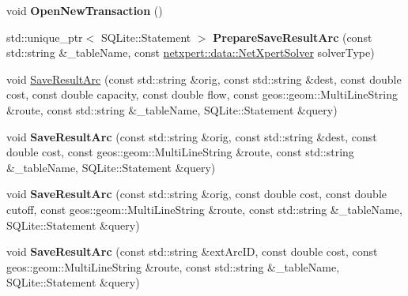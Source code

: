 \begin{DoxyCompactItemize}
\item 
void {\bfseries Open\+New\+Transaction} ()\hypertarget{classnetxpert_1_1io_1_1SpatiaLiteWriter_aa469d8a214f7a3e2fbbde78480f1ceae}{}\label{classnetxpert_1_1io_1_1SpatiaLiteWriter_aa469d8a214f7a3e2fbbde78480f1ceae}

\item 
std\+::unique\+\_\+ptr$<$ S\+Q\+Lite\+::\+Statement $>$ {\bfseries Prepare\+Save\+Result\+Arc} (const std\+::string \&\+\_\+table\+Name, const \hyperlink{namespacenetxpert_1_1data_a923ee7cb7eab8b9dbfd62fb6d26f51cb}{netxpert\+::data\+::\+Net\+Xpert\+Solver} solver\+Type)\hypertarget{classnetxpert_1_1io_1_1SpatiaLiteWriter_ad2805936f5c7a5791f0f9d37e340abc7}{}\label{classnetxpert_1_1io_1_1SpatiaLiteWriter_ad2805936f5c7a5791f0f9d37e340abc7}

\item 
void \hyperlink{classnetxpert_1_1io_1_1SpatiaLiteWriter_a54a18cc63018ff0e7a8f96248fcf2785}{Save\+Result\+Arc} (const std\+::string \&orig, const std\+::string \&dest, const double cost, const double capacity, const double flow, const geos\+::geom\+::\+Multi\+Line\+String \&route, const std\+::string \&\+\_\+table\+Name, S\+Q\+Lite\+::\+Statement \&query)
\item 
void {\bfseries Save\+Result\+Arc} (const std\+::string \&orig, const std\+::string \&dest, const double cost, const geos\+::geom\+::\+Multi\+Line\+String \&route, const std\+::string \&\+\_\+table\+Name, S\+Q\+Lite\+::\+Statement \&query)\hypertarget{classnetxpert_1_1io_1_1SpatiaLiteWriter_a2095cd746371906d7c890452ae9f7f9f}{}\label{classnetxpert_1_1io_1_1SpatiaLiteWriter_a2095cd746371906d7c890452ae9f7f9f}

\item 
void {\bfseries Save\+Result\+Arc} (const std\+::string \&orig, const double cost, const double cutoff, const geos\+::geom\+::\+Multi\+Line\+String \&route, const std\+::string \&\+\_\+table\+Name, S\+Q\+Lite\+::\+Statement \&query)\hypertarget{classnetxpert_1_1io_1_1SpatiaLiteWriter_ae9a68d34b908fadcfc86487c6012c678}{}\label{classnetxpert_1_1io_1_1SpatiaLiteWriter_ae9a68d34b908fadcfc86487c6012c678}

\item 
void {\bfseries Save\+Result\+Arc} (const std\+::string \&ext\+Arc\+ID, const double cost, const geos\+::geom\+::\+Multi\+Line\+String \&route, const std\+::string \&\+\_\+table\+Name, S\+Q\+Lite\+::\+Statement \&query)\hypertarget{classnetxpert_1_1io_1_1SpatiaLiteWriter_ad5699d9fcd9c30023aa0be395ec004ef}{}\label{classnetxpert_1_1io_1_1SpatiaLiteWriter_ad5699d9fcd9c30023aa0be395ec004ef}


\end{DoxyCompactItemize}
